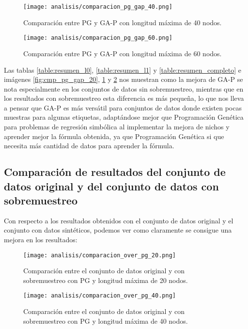\begin{figure}[H]
    \centering
	  \texttt{[image: analisis/comparacion\_pg\_gap\_40.png]}
	  \caption{Comparación entre PG y GA-P con longitud máxima de 40 nodos.}\label{fig:cmp_pg_gap_40}

\end{figure}

\begin{figure}[H]
    \centering
	  \texttt{[image: analisis/comparacion\_pg\_gap\_60.png]}
	  \caption{Comparación entre PG y GA-P con longitud máxima de 60 nodos.}\label{fig:cmp_pg_gap_60}
\end{figure}



Las tablas \ref{table:resumen_l0}, \ref{table:resumen_l1} y \ref{table:resumen_completo} e imágenes \ref{fig:cmp_pg_gap_20}, \ref{fig:cmp_pg_gap_40} y \ref{fig:cmp_pg_gap_60} nos muestran como la mejora de GA-P se nota especialmente en los conjuntos de datos sin sobremuestreo, mientras que en los resultados con sobremuestreo esta diferencia es más pequeña, lo que nos lleva a pensar que GA-P es más versátil para conjuntos de datos donde existen pocas muestras para algunas etiquetas, adaptándose mejor que Programación Genética para problemas de regresión simbólica al implementar la mejora de nichos y aprender mejor la fórmula obtenida, ya que Programación Genética si que necesita más cantidad de datos para aprender la fórmula.

\subsection{Comparación de resultados del conjunto de datos original y del conjunto de datos con sobremuestreo}

Con respecto a los resultados obtenidos con el conjunto de datos original y el conjunto con datos sintéticos, podemos ver como claramente se consigue una mejora en los resultados:

\begin{figure}[H]
    \centering
	  \texttt{[image: analisis/comparacion\_over\_pg\_20.png]}
	  \caption{Comparación entre el conjunto de datos original y con sobremuestreo con PG y longitud máxima de 20 nodos.}\label{fig:cmp_pg_over_20}

\end{figure}

\begin{figure}[H]
    \centering
	  \texttt{[image: analisis/comparacion\_over\_pg\_40.png]}
	  \caption{Comparación entre el conjunto de datos original y con sobremuestreo con PG y longitud máxima de 40 nodos.}\label{fig:cmp_pg_over_40}

\end{figure}


